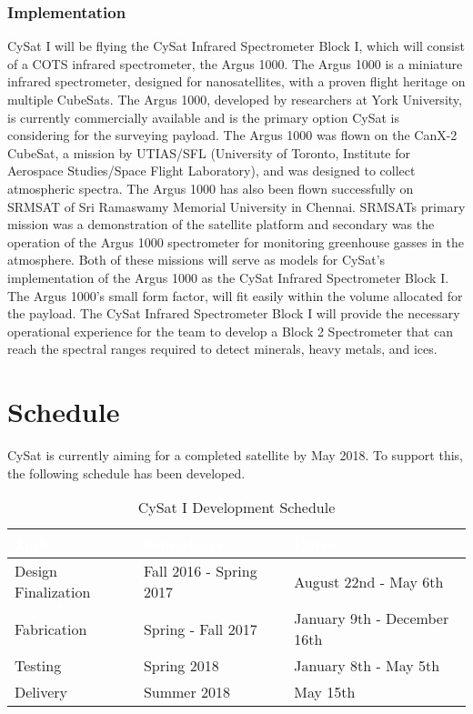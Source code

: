 \documentclass[nocover]            %
{CSLI}                       %
\begin{document}
\subsubsection{Implementation}
CySat I will be flying the CySat Infrared Spectrometer Block I, which will consist of a COTS infrared spectrometer, the Argus 1000. The Argus 1000 is a miniature infrared spectrometer, designed for nanosatellites, with a proven flight heritage on multiple CubeSats. The Argus 1000, developed by researchers at York University, is currently commercially available and is the primary option CySat is considering for the surveying payload. The Argus 1000 was flown on the CanX-2 CubeSat, a mission by UTIAS/SFL (University of Toronto, Institute for Aerospace Studies/Space Flight Laboratory), and was designed to collect atmospheric spectra. The Argus 1000 has also been flown successfully on SRMSAT of Sri Ramaswamy Memorial University in Chennai. SRMSATs primary mission was a demonstration of the satellite platform and secondary was the operation of the Argus 1000 spectrometer for monitoring greenhouse gasses in the atmosphere. Both of these missions will serve as models for CySat's implementation of the Argus 1000 as the CySat Infrared Spectrometer Block I. The Argus 1000's small form factor, will fit easily within the volume allocated for the payload. The CySat Infrared Spectrometer Block I will provide the necessary operational experience for the team to develop a Block 2 Spectrometer that can reach the spectral ranges required to detect minerals, heavy metals, and ices.

\section{Schedule}
CySat is currently aiming for a completed satellite by May 2018. To support this, the following schedule has been developed.
\begin{table}[H]
\centering
\caption{CySat I Development Schedule}
\begin{tabular}{| l | l | l |}
\arrayrulecolor{white}
\hline
\rowcolor{gray!80}
\textcolor{white}{\textbf{Task}} & \textcolor{white}{\textbf{Semester(s)}} & \textcolor{white}{\textbf{Dates}} \\ \hline
\rowcolor{gray!10}
Design Finalization & Fall 2016 - Spring 2017& August 22nd - May 6th  \\ \hline
\rowcolor{gray!5}
Fabrication & Spring - Fall 2017 & January 9th - December 16th  \\ \hline
\rowcolor{gray!10}
Testing & Spring 2018 & January 8th - May 5th   \\ \hline
\rowcolor{gray!5}
Delivery & Summer 2018 & May 15th \\ \hline
\end{tabular}
\end{table}
\end{document}
